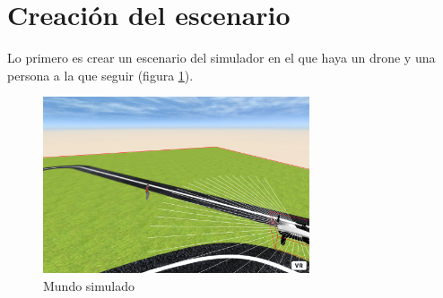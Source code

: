 \section{Creación del escenario}
Lo primero es crear un escenario del simulador en el que haya un drone y una persona a la que seguir (figura \ref{fig:mundoSim}).
\begin{figure}[H]
  \begin{center}
    \includegraphics[width=0.7\textwidth]{figures/simulado/sim1.png}
		\caption{Mundo simulado}
		\label{fig:mundoSim}
		\end{center}
\end{figure}

